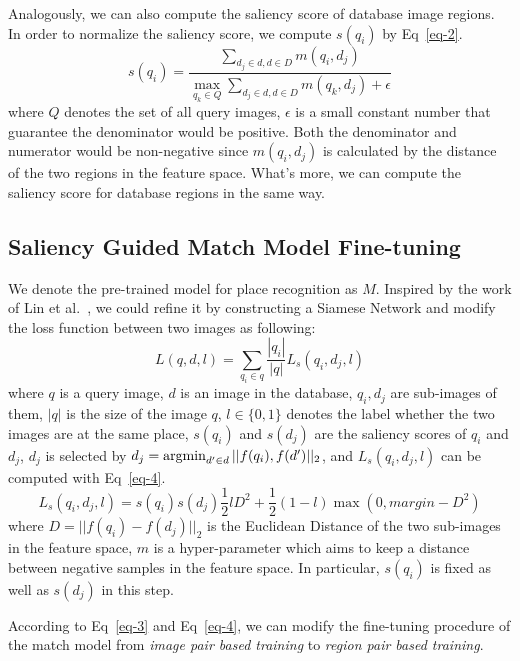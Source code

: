 \par
Analogously, we can also compute the saliency score of database image regions. In order to normalize the saliency score, we compute $s(q_i)$ by Eq~\eqref{eq-2}.
\begin{equation}
s(q_i) = \frac{\sum_{d_j \in d, d \in D} m(q_i, d_j)}{\max_{q_k \in Q}\sum_{d_j \in d, d \in D} m(q_k, d_j) + \epsilon}
\label{eq-2}
\end{equation}
where $Q$ denotes the set of all query images, $\epsilon$ is a small constant number that guarantee the denominator would be positive. Both the denominator and numerator would be non-negative since $m(q_i, d_j)$ is calculated by the distance of the two regions in the feature space. What's more, we can compute the saliency score for database regions in the same way. 
\subsection{Saliency Guided Match Model Fine-tuning}
\par
We denote the pre-trained model for place recognition as $M$. Inspired by the work of Lin et al.~\cite{lin2015learning}, we could refine it by constructing a Siamese Network and modify the loss function between two images as following:
\begin{equation}
\label{eq-3}
L(q,d,l) = \sum_{q_i\in q} \frac{|q_i|}{|q|} L_s(q_i, d_j, l)
\end{equation}
where $q$ is a query image, $d$ is an image in the database, $q_i, d_j$ are sub-images of them, $|q|$ is the size of the image $q$, $l\in \{0,1\}$ denotes the label whether the two images are at the same place, $s(q_i)$ and $s(d_j)$ are the saliency scores of $q_i$ and $d_j$, $d_j$ is selected by $d_j = \operatorname*{argmin}_{{d'} \in d} ||f(q_i), f({d'})||_2 $, and $L_s(q_i, d_j, l)$ can be computed with Eq~\eqref{eq-4}.
\begin{equation}
\label{eq-4}
L_s(q_i, d_j, l)=s(q_i)s(d_j)\frac{1}{2}lD^2 + \frac{1}{2}(1-l)\max(0,margin-D^2)
\end{equation}
where $D = ||f(q_i) - f(d_j)||_2$ is the Euclidean Distance of the two sub-images in the feature space, $m$ is a hyper-parameter which aims to keep a distance between negative samples in the feature space. In particular, $s(q_i)$ is fixed as well as $s(d_j)$ in this step. 
\par
According to Eq~\eqref{eq-3} and Eq~\eqref{eq-4}, we can modify the fine-tuning procedure of the match model from {\sl image pair based training} to {\sl region pair based training}. 

